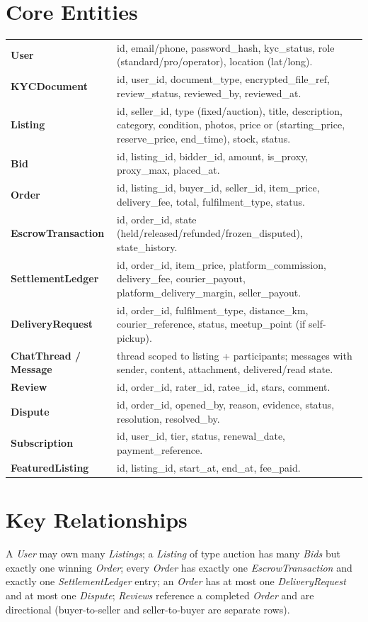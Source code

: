 \documentclass[11pt,a4paper]{report}
\newenvironment{reqtable}{\begin{longtable}{p{2.2cm}p{11.5cm}}}{\end{longtable}}
\begin{document}
\section{Core Entities}
\begin{reqtable}
\textbf{User} & id, email/phone, password\_hash, kyc\_status, role (standard/pro/operator), location (lat/long). \\
\textbf{KYCDocument} & id, user\_id, document\_type, encrypted\_file\_ref, review\_status, reviewed\_by, reviewed\_at. \\
\textbf{Listing} & id, seller\_id, type (fixed/auction), title, description, category, condition, photos, price or (starting\_price, reserve\_price, end\_time), stock, status. \\
\textbf{Bid} & id, listing\_id, bidder\_id, amount, is\_proxy, proxy\_max, placed\_at. \\
\textbf{Order} & id, listing\_id, buyer\_id, seller\_id, item\_price, delivery\_fee, total, fulfilment\_type, status. \\
\textbf{EscrowTransaction} & id, order\_id, state (held/released/refunded/frozen\_disputed), state\_history. \\
\textbf{SettlementLedger} & id, order\_id, item\_price, platform\_commission, delivery\_fee, courier\_payout, platform\_delivery\_margin, seller\_payout. \\
\textbf{DeliveryRequest} & id, order\_id, fulfilment\_type, distance\_km, courier\_reference, status, meetup\_point (if self-pickup). \\
\textbf{ChatThread / Message} & thread scoped to listing + participants; messages with sender, content, attachment, delivered/read state. \\
\textbf{Review} & id, order\_id, rater\_id, ratee\_id, stars, comment. \\
\textbf{Dispute} & id, order\_id, opened\_by, reason, evidence, status, resolution, resolved\_by. \\
\textbf{Subscription} & id, user\_id, tier, status, renewal\_date, payment\_reference. \\
\textbf{FeaturedListing} & id, listing\_id, start\_at, end\_at, fee\_paid. \\
\end{reqtable}

\section{Key Relationships}
A \emph{User} may own many \emph{Listings}; a \emph{Listing} of type auction has many \emph{Bids} but exactly one winning \emph{Order}; every \emph{Order} has exactly one \emph{EscrowTransaction} and exactly one \emph{SettlementLedger} entry; an \emph{Order} has at most one \emph{DeliveryRequest} and at most one \emph{Dispute}; \emph{Reviews} reference a completed \emph{Order} and are directional (buyer-to-seller and seller-to-buyer are separate rows).
\end{document}

